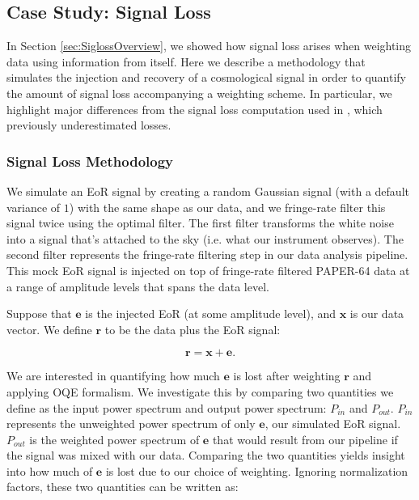 \documentclass[preprint2,numberedappendix,tighten]{aastex6}  %
\begin{document}

\subsection{Case Study: Signal Loss}
\label{sec:Sigloss}

In Section \ref{sec:SiglossOverview}, we showed how signal loss arises when weighting data using information from itself. Here we describe a methodology that simulates the injection and recovery of a cosmological signal in order to quantify the amount of signal loss accompanying a weighting scheme. In particular, we highlight major differences from the signal loss computation used in \citet{ali_et_al2015}, which previously underestimated losses. 

\subsubsection{Signal Loss Methodology} 

We simulate an EoR signal by creating a random Gaussian signal (with a default variance of $1$) with the same shape as our data, and we fringe-rate filter this signal twice using the optimal filter. The first filter transforms the white noise into a signal that's attached to the sky (i.e. what our instrument observes). The second filter represents the fringe-rate filtering step in our data analysis pipeline. This mock EoR signal is injected on top of fringe-rate filtered PAPER-64 data at a range of amplitude levels that spans the data level.

Suppose that $\textbf{e}$ is the injected EoR (at some amplitude level), and $\textbf{x}$ is our data vector. We define $\textbf{r}$ to be the data plus the EoR signal:

\begin{equation}
\textbf{r} = \textbf{x} + \textbf{e}.
\end{equation}

We are interested in quantifying how much $\textbf{e}$ is lost after weighting $\textbf{r}$ and applying OQE formalism. We investigate this by comparing two quantities we define as the input power spectrum and output power spectrum: $P_{in}$ and $P_{out}$. $P_{in}$ represents the unweighted power spectrum of only $\textbf{e}$, our simulated EoR signal. $P_{out}$ is the weighted power spectrum of $\textbf{e}$ that would result from our pipeline if the signal was mixed with our data. Comparing the two quantities yields insight into how much of $\textbf{e}$ is lost due to our choice of weighting. Ignoring normalization factors, these two quantities can be written as:
\end{document}
